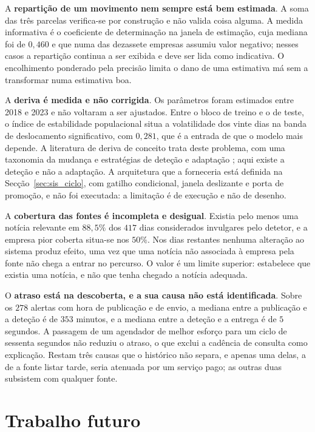A \textbf{repartição de um movimento nem sempre está bem estimada}. A soma das três parcelas
verifica-se por construção e não valida coisa alguma. A medida informativa é o coeficiente de
determinação na janela de estimação, cuja mediana foi de $0{,}460$ e que numa das dezassete empresas
assumiu valor negativo; nesses casos a repartição continua a ser exibida e deve ser lida como
indicativa. O encolhimento ponderado pela precisão \autocite{vasicek1973beta} limita o dano de uma
estimativa má sem a transformar numa estimativa boa.

A \textbf{deriva é medida e não corrigida}. Os parâmetros foram estimados entre 2018 e 2023 e não
voltaram a ser ajustados. Entre o bloco de treino e o de teste, o índice de estabilidade
populacional situa a volatilidade dos vinte dias na banda de deslocamento significativo, com
$0{,}281$, que é a entrada de que o modelo mais depende. A literatura de deriva de conceito trata
deste problema, com uma taxonomia da mudança e estratégias de deteção e adaptação
\autocite{gama2014survey}; aqui existe a deteção e não a adaptação. A arquitetura que a forneceria
está definida na Secção~\ref{sec:sis_ciclo}, com gatilho condicional, janela deslizante e porta de
promoção, e não foi executada: a limitação é de execução e não de desenho.

A \textbf{cobertura das fontes é incompleta e desigual}. Existia pelo menos uma notícia relevante em
$88{,}5\%$ dos $417$ dias considerados invulgares pelo detetor, e a empresa pior coberta situa-se
nos $50\%$. Nos dias restantes nenhuma alteração ao sistema produz efeito, uma vez que uma notícia
não associada à empresa pela fonte não chega a entrar no percurso. O valor é um limite superior:
estabelece que existia uma notícia, e não que tenha chegado a notícia adequada.

O \textbf{atraso está na descoberta, e a sua causa não está identificada}. Sobre os $278$ alertas
com hora de publicação e de envio, a mediana entre a publicação e a deteção é de $353$ minutos, e a
mediana entre a deteção e a entrega é de $5$ segundos. A passagem de um agendador de melhor esforço
para um ciclo de sessenta segundos não reduziu o atraso, o que exclui a cadência de consulta como
explicação. Restam três causas que o histórico não separa, e apenas uma delas, a de a fonte listar
tarde, seria atenuada por um serviço pago; as outras duas subsistem com qualquer fonte.

\section{Trabalho futuro}
\label{sec:con_futuro}

